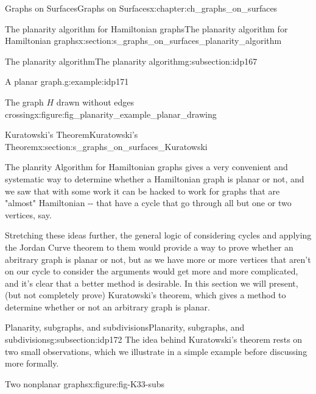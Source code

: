 \documentclass[oneside,10pt,]{book}
\numberwithin{equation}{section}
\begin{document}
\begin{chapterptx}{Graphs on Surfaces}{}{Graphs on Surfaces}{}{}{x:chapter:ch_graphs_on_surfaces}
\begin{sectionptx}{The planarity algorithm for Hamiltonian graphs}{}{The planarity algorithm for Hamiltonian graphs}{}{}{x:section:s_graphs_on_surfaces_planarity_algorithm}
\begin{subsectionptx}{The planarity algorithm}{}{The planarity algorithm}{}{}{g:subsection:idp167}
\begin{example}{A planar graph.}{g:example:idp171}
\begin{figureptx}{The graph \(H\) drawn without edges crossing}{x:figure:fig_planarity_example_planar_drawing}{}
\begin{image}{0.15}{0.7}{0.15}
{\begin{tikzpicture}[scale=.7]
\end{tikzpicture}
}%
\end{image}%
\tcblower
\end{figureptx}%
\end{example}
\end{subsectionptx}
\end{sectionptx}
%
%
\typeout{************************************************}
\typeout{************************************************}
%
\begin{sectionptx}{Kuratowski's Theorem}{}{Kuratowski's Theorem}{}{}{x:section:s_graphs_on_surfaces_Kuratowski}
\begin{introduction}{}%
The planrity Algorithm for Hamiltonian graphs gives a very convenient and systematic way to determine whether a Hamiltonian graph is planar or not, and we saw that with some work it can be hacked to work for graphs that are "almost" Hamiltonian -{}-{} that have a cycle that go through all but one or two vertices, say.%
\par
Stretching these ideas further, the general logic of considering cycles and applying the Jordan Curve theorem to them would provide a way to prove whether an abritrary graph is planar or not, but as we have more or more vertices that aren't on our cycle to consider the arguments would get more and more complicated, and it's clear that a better method is desirable.  In this section we will present, (but not completely prove) Kuratowski's theorem, which gives a method to determine whether or not an arbitrary graph is planar.%
\end{introduction}%
%
%
\typeout{************************************************}
\typeout{************************************************}
%
\begin{subsectionptx}{Planarity, subgraphs, and subdivisions}{}{Planarity, subgraphs, and subdivisions}{}{}{g:subsection:idp172}
The idea behind Kuratowski's theorem rests on two small observations, which we illustrate in a simple example before discussing more formally.%
\begin{figureptx}{Two nonplanar graphs}{x:figure:fig-K33-subs}{}%
\begin{image}{0.05}{0.9}{0.05}%
\end{image}
\end{figureptx}
\end{subsectionptx}
\end{sectionptx}
\end{chapterptx}
\end{document}
